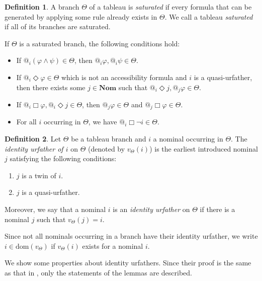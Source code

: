 \documentclass{article}
\theoremstyle{definition}
\newtheorem{definition}{Definition}[section]
\newcommand{\Nom}{\mathbf{Nom}}
\newcommand{\Dia}{\Diamond}
\newcommand{\dom}{\mathrm{dom}}
\begin{document}
\begin{definition}
    A branch $\Theta$ of a tableau is \emph{saturated} if every formula that can be generated by applying some rule already exists in $\Theta$. We call a tableau \emph{saturated} if all of its branches are saturated.
\end{definition}

If $\Theta$ is a saturated branch, the following conditions hold:
\begin{itemize}
    \item If $@_i (\varphi \land \psi) \in \Theta$, then $@_i \varphi, @_i \psi \in \Theta$.
    \item If $@_i \Dia \varphi \in \Theta$ which is not an accessibility formula and $i$ is a quasi-urfather, then there exists some $j \in \Nom$ such that $@_i \Dia j, @_j \varphi \in \Theta$.
    \item If $@_i \Box \varphi, @_i \Dia j \in \Theta$, then $@_j \varphi \in \Theta$ and $@_j \Box \varphi \in \Theta$.
    \item For all $i$ occurring in $\Theta$, we have $@_i \Box \neg i \in \Theta$.
\end{itemize}

\begin{definition}
  Let $\Theta$ be a tableau branch and $i$ a nominal occurring in $\Theta$. The \emph{identity urfather of $i$} on $\Theta$ (denoted by $v_\Theta(i)$) is the earliest introduced nominal $j$ satisfying the following conditions:
  \begin{enumerate}
    \item $j$ is a twin of $i$.
    \item $j$ is a quasi-urfather.
  \end{enumerate}
  Moreover, we say that a nominal $i$ is an \emph{identity urfather} on $\Theta$ if there is a nominal $j$ such that $v_\Theta(j) = i$.
  \label{defiur}
\end{definition}

Since not all nominals occurring in a branch have their identity urfather, we write $i \in \dom(v_\Theta)$ if $v_\Theta(i)$ exists for a nominal $i$.

We show some properties about identity urfathers. Since their proof is the same as that in \cite[Lemma 5-9]{nishimura2025}, only the statements of the lemmas are described.
\end{document}
